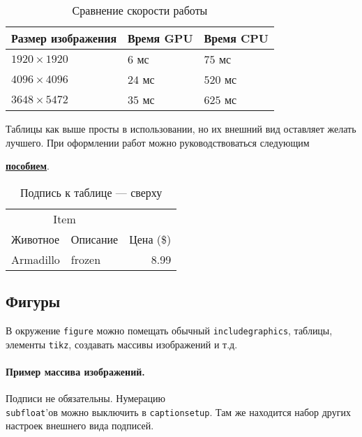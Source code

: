 \begin{table}[H]
    \centering
    \begin{tabularx}{\textwidth}{| X | X | X |}
    	\hline
    	\textbf{Размер изображения} & \textbf{Время GPU} & \textbf{Время CPU} \\ \hline
    	$1920\times 1920$           & $6$ мс             & $75$ мс            \\ \hline
    	$4096\times 4096$           & $24$ мс            & $520$ мс           \\ \hline
    	$3648\times 5472$           & $35$ мс            & $625$ мс           \\ \hline
    \end{tabularx}
    \caption{Сравнение скорости работы}
\end{table}

Таблицы как выше просты в использовании, но их внешний вид оставляет желать лучшего. При оформлении работ можно руководствоваться следующим {\href{https://www.inf.ethz.ch/personal/markusp/teaching/guides/guide-tables.pdf}{\textbf{пособием}}.


\begin{table}[H]
    \centering
    \caption{\label{tab:widgets}Подпись к таблице --- сверху}
    \begin{tabular}{llr}
        \toprule
                  \multicolumn{2}{c}{Item}            &  \\
        \cmidrule(r){1-2}
        Животное & Описание & Цена (\$) \\ \midrule
        Armadillo                          & frozen   &      8.99 \\ \bottomrule
    \end{tabular}
\end{table}


\subsection{Фигуры}
В окружение \texttt{figure} можно помещать обычный \texttt{includegraphics}, таблицы, элементы \texttt{tikz}, создавать массивы изображений и т.д.

\paragraph{Пример массива изображений.}
Подписи не обязательны. Нумерацию \\ \texttt{subfloat}'ов можно выключить в \texttt{captionsetup}. Там же находится набор других настроек внешнего вида подписей.

}
